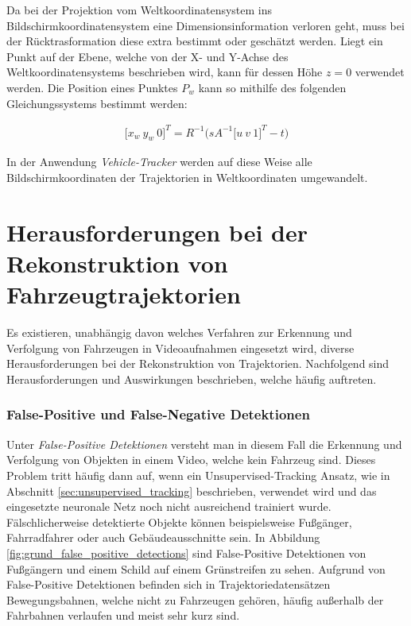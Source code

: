 Da bei der Projektion vom Weltkoordinatensystem ins Bildschirmkoordinatensystem eine Dimensionsinformation
verloren geht, muss bei der Rücktrasformation diese extra bestimmt oder geschätzt werden. Liegt ein Punkt
auf der Ebene, welche von der X- und Y-Achse des Weltkoordinatensystems beschrieben wird, kann für dessen
Höhe $z = 0$ verwendet werden.
Die Position eines Punktes $P_w$ kann so mithilfe des folgenden Gleichungssystems bestimmt werden:

\begin{ceqn}
\begin{align}
\label{eq_point_transformation3}
    \big[x_w\ y_w\ 0\big]^T = R^{-1}\Big(sA^{-1} \big[u\ v\ 1\big]^T - t\Big)
\end{align}
\end{ceqn}

In der Anwendung \textit{Vehicle-Tracker} werden auf diese Weise alle Bildschirmkoordinaten der Trajektorien
in Weltkoordinaten umgewandelt.

\section{Herausforderungen bei der Rekonstruktion von Fahrzeugtrajektorien}

Es existieren, unabhängig davon welches Verfahren zur Erkennung und Verfolgung von Fahrzeugen in Videoaufnahmen
eingesetzt wird, diverse Herausforderungen bei der Rekonstruktion von Trajektorien. Nachfolgend sind
Herausforderungen und Auswirkungen beschrieben, welche häufig auftreten.

\subsubsection*{False-Positive und False-Negative Detektionen}
Unter \textit{False-Positive Detektionen} versteht man in diesem Fall die Erkennung und Verfolgung
von Objekten in einem Video, welche kein Fahrzeug sind.
Dieses Problem tritt häufig dann auf, wenn ein Unsupervised-Tracking Ansatz, wie in Abschnitt \ref{sec:unsupervised_tracking}
beschrieben, verwendet wird und das eingesetzte neuronale Netz noch nicht ausreichend trainiert wurde.
Fälschlicherweise detektierte Objekte können beispielsweise Fußgänger, Fahrradfahrer oder auch Gebäudeausschnitte sein.
In Abbildung \ref{fig:grund_false_positive_detections} sind False-Positive Detektionen von Fußgängern
und einem Schild auf einem Grünstreifen zu sehen.
Aufgrund von False-Positive Detektionen befinden sich in Trajektoriedatensätzen Bewegungsbahnen, welche nicht zu
Fahrzeugen gehören, häufig außerhalb der Fahrbahnen verlaufen und meist sehr kurz sind.

